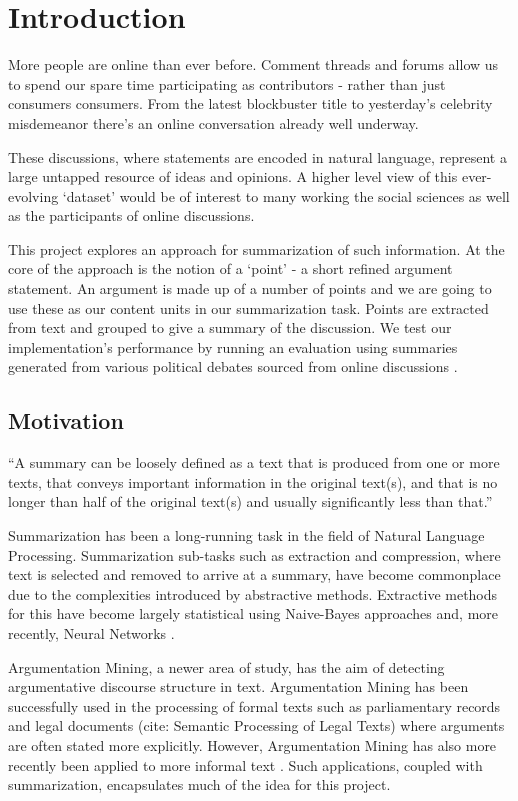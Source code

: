 \chapter{Introduction\label{chap:introduction}}
  More people are online than ever before. Comment threads and forums allow us to spend our spare time participating as contributors - rather than just consumers consumers. From the latest blockbuster title to yesterday's celebrity misdemeanor there's an online conversation already well underway.

  These discussions, where statements are encoded in natural language, represent a large untapped resource of ideas and opinions. A higher level view of this ever-evolving `dataset' would be of interest to many working the social sciences as well as the participants of online discussions.

  This project explores an approach for summarization of such information. At the core of the approach is the notion of a `point' - a short refined argument statement. An argument is made up of a number of points and we are going to use these as our content units in our summarization task. Points are extracted from text and grouped to give a summary of the discussion. We test our implementation's performance by running an evaluation using summaries generated from various political debates sourced from online discussions \cite{walker2012corpus}.

  \section{Motivation}
    ``A summary can be loosely defined as a text that is produced from one or more texts, that conveys important information in the original text(s), and that is no longer than half of the original text(s) and usually significantly less than that.'' \cite{radev2002introduction}

    Summarization has been a long-running task in the field of Natural Language Processing. Summarization sub-tasks such as extraction and compression, where text is selected and removed to arrive at a summary, have become commonplace due to the complexities introduced by abstractive methods. Extractive methods for this have become largely statistical using Naive-Bayes \cite{kupiec1995trainable} approaches and, more recently, Neural Networks \cite{svore2007enhancing}.

    Argumentation Mining, a newer area of study, has the aim of detecting argumentative discourse structure in text. Argumentation Mining has been successfully used in the processing of formal texts such as parliamentary records \cite{palau2009argumentation} and legal documents (cite: Semantic Processing of Legal Texts) where arguments are often stated more explicitly. However, Argumentation Mining has also more recently been applied to more informal text \cite{park2015conditional}. Such applications, coupled with summarization, encapsulates much of the idea for this project.

